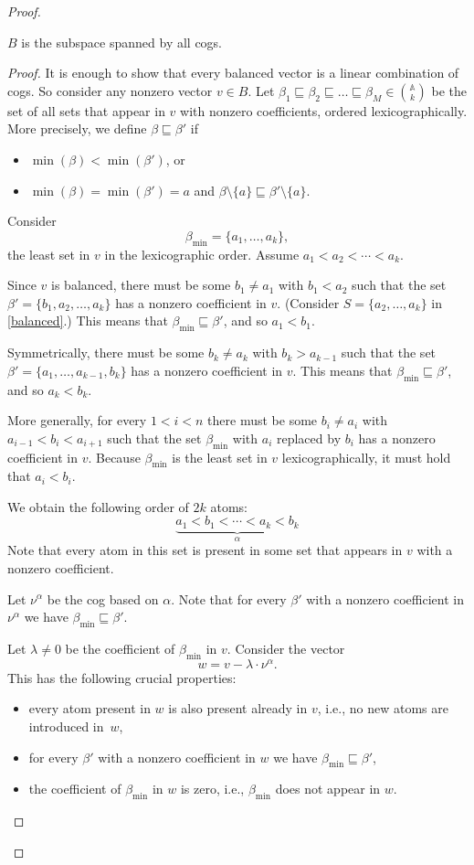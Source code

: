 \documentclass{theoretics}
\newcommand{\atoms}{\mathbb A}
\begin{document}
\begin{proof}
\begin{claim}\label{clm:Bcogs}
$B$ is the subspace spanned by all cogs.
\end{claim}
\begin{proof}
It is enough to show that every balanced vector is a linear combination of cogs. So consider any nonzero vector $v\in B$. Let $\beta_1\sqsubseteq \beta_2\sqsubseteq\ldots\sqsubseteq\beta_M\in{\atoms\choose k}$ be the set of all sets that appear in $v$ with nonzero coefficients, ordered lexicographically. More precisely, we define $\beta\sqsubseteq\beta'$ if 
\begin{itemize}
\item $\min(\beta)<\min(\beta')$, or
\item $\min(\beta)=\min(\beta')=a$ and $\beta\setminus\{a\}\sqsubseteq\beta'\setminus\{a\}$.
\end{itemize}
Consider
\[
	\beta_{\textrm{min}} = \{a_1,\ldots,a_k\},
\]
the least set in $v$ in the lexicographic order. Assume $a_1<a_2<\cdots <a_k$. 

Since $v$ is balanced, there must be some $b_1\neq a_1$ with $b_1<a_2$ such that the set $\beta'=\{b_1,a_2,\ldots,a_k\}$ has a nonzero coefficient in $v$. (Consider $S=\{a_2,\ldots, a_{k}\}$ in \eqref{balanced}.) This means that $\beta_{\textrm{min}}\sqsubseteq\beta'$, and so $a_1<b_1$.

Symmetrically, there must be some $b_k\neq a_k$ with $b_k>a_{k-1}$ such that the set $\beta'=\{a_1,\ldots,a_{k-1},b_k\}$ has a nonzero coefficient in $v$. This means that $\beta_{\textrm{min}}\sqsubseteq\beta'$, and so $a_k<b_k$.

More generally, for every $1<i<n$ there must be some $b_i\neq a_i$ with $a_{i-1}<b_i<a_{i+1}$ such that the set $\beta_{\textrm{min}}$ with $a_i$ replaced by $b_i$ has a nonzero coefficient in $v$. Because $\beta_{\textrm{min}}$ is the least set in $v$ lexicographically, it must hold that $a_i<b_i$.

We obtain the following order of $2k$ atoms:
\[
	\underbrace{a_1<b_1<\cdots<a_k<b_k}_\alpha
\]
Note that every atom in this set is present in some set that appears in $v$ with a nonzero coefficient. 

Let $\nu^\alpha$ be the cog based on $\alpha$. Note that for every $\beta'$ with a nonzero coefficient in $\nu^\alpha$ we have $\beta_{\textrm{min}}\sqsubseteq \beta'$.

Let $\lambda\neq 0$ be the coefficient of $\beta_{\textrm{min}}$ in $v$.
Consider the vector
\[
	w = v-\lambda\cdot\nu^\alpha.
\]
This has the following crucial properties:
\begin{itemize}
\item every atom present in $w$ is also present already in $v$, i.e., no new atoms are introduced in~$w$,
\item for every $\beta'$ with a nonzero coefficient in $w$ we have $\beta_{\textrm{min}}\sqsubseteq \beta'$,
\item the coefficient of $\beta_{\textrm{min}}$ in $w$ is zero, i.e., $\beta_{\textrm{min}}$ does not appear in $w$.
\end{itemize}


\end{proof}
\end{proof}
\end{document}
